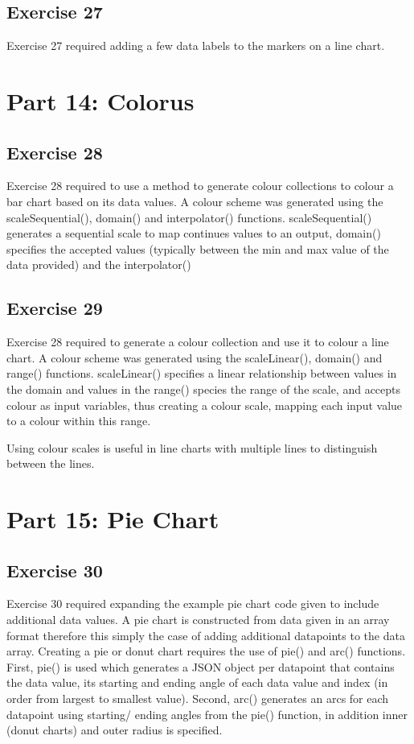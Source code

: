 \documentclass[11pt]{article}   	%
\begin{document}
\subsection{Exercise 27 }
Exercise 27 required adding a few data labels to the markers on a line chart.


\section{Part 14: Colorus}
\subsection{ Exercise 28 }
Exercise 28 required to use a method to generate colour collections to colour a bar chart based on its data values. A colour scheme was generated using the scaleSequential(), domain() and interpolator() functions. scaleSequential() generates a sequential scale to map continues values to an output, domain() specifies the accepted values (typically between the min and max value of the data provided) and the interpolator() 



\subsection{Exercise 29 }
Exercise 28 required to generate a colour collection and use it to colour a line chart. A colour scheme was generated using the scaleLinear(), domain() and range() functions. scaleLinear() specifies a linear relationship between values in the domain and values in the range() species the range of the scale, and accepts colour as input variables, thus creating a colour scale, mapping each input value to a colour within this range. \linebreak

Using colour scales is useful in line charts with multiple lines to distinguish between the lines.


\section{Part 15: Pie Chart }
\subsection{Exercise 30}
Exercise 30 required expanding the example pie chart code given to include additional data values. A pie chart is constructed from data given in an array format therefore this simply the case of adding additional datapoints to the data array. Creating a pie or donut chart requires the use of pie() and arc() functions. First, pie() is used which generates a JSON object per datapoint that contains the data value, its starting and ending angle of each data value and index (in order from largest to smallest value). Second, arc() generates an arcs for each datapoint using starting/ ending angles from the pie() function, in addition inner (donut charts) and outer radius is specified.
\end{document}
